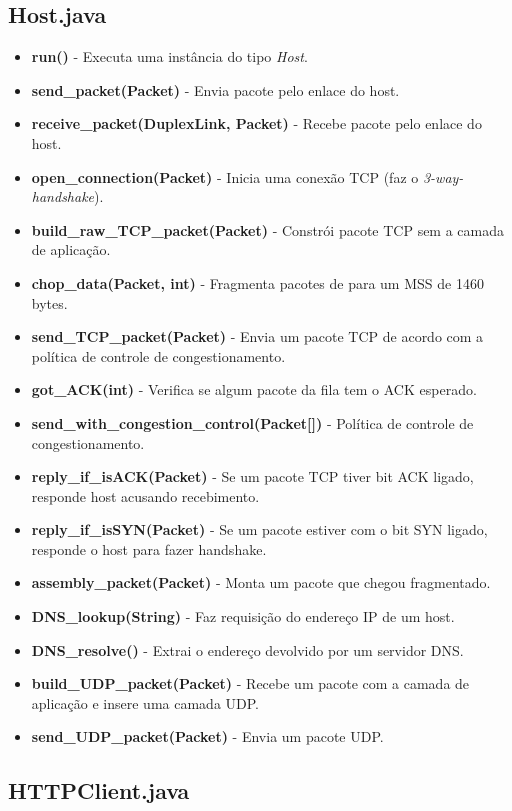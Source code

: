 \documentclass[11pt]{article}
\begin{document}
\subsection{Host.java}

\begin{itemize}
	\item \textbf{run()} - Executa uma instância do tipo \textit{Host}.
	\item \textbf{send\_packet(Packet)} - Envia pacote pelo enlace do host.
	\item \textbf{receive\_packet(DuplexLink, Packet)} - Recebe pacote pelo enlace do host.
	\item \textbf{open\_connection(Packet)} - Inicia uma conexão TCP (faz o \textit{3-way-handshake}).
	\item \textbf{build\_raw\_TCP\_packet(Packet)} - Constrói pacote TCP sem a camada de aplicação.
	\item \textbf{chop\_data(Packet, int)} - Fragmenta pacotes de para um MSS de 1460 bytes.
	\item \textbf{send\_TCP\_packet(Packet)} - Envia um pacote TCP de acordo com a política de controle de congestionamento.
	\item \textbf{got\_ACK(int)} - Verifica se algum pacote da fila tem o ACK esperado.
	\item \textbf{send\_with\_congestion\_control(Packet[])} - Política de controle de congestionamento.
	\item \textbf{reply\_if\_isACK(Packet)} - Se um pacote TCP tiver bit ACK ligado, responde host acusando recebimento.
	\item \textbf{reply\_if\_isSYN(Packet)} - Se um pacote estiver com o bit SYN ligado, responde o host para fazer handshake.
	\item \textbf{assembly\_packet(Packet)} - Monta um pacote que chegou fragmentado.
	\item \textbf{DNS\_lookup(String)} - Faz requisição do endereço IP de um host.
	\item \textbf{DNS\_resolve()} - Extrai o endereço devolvido por um servidor DNS.
	\item \textbf{build\_UDP\_packet(Packet)} - Recebe um pacote com a camada de aplicação e insere uma camada UDP.
	\item \textbf{send\_UDP\_packet(Packet)} - Envia um pacote UDP.
\end{itemize}

\subsection{HTTPClient.java}
\end{document}
